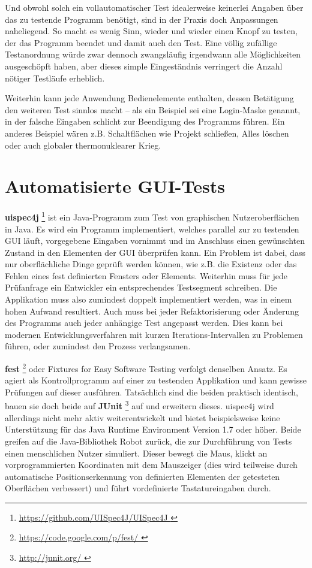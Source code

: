 Und obwohl solch ein vollautomatischer Test idealerweise keinerlei Angaben
über das zu testende Programm benötigt, sind in der Praxis doch Anpassungen
naheliegend. So macht es wenig Sinn, wieder und wieder einen Knopf zu testen,
der das Programm beendet und damit auch den Test. Eine völlig zufällige
Testanordnung würde zwar dennoch zwangsläufig irgendwann alle Möglichkeiten
ausgeschöpft haben, aber dieses simple Eingeständnis verringert die
Anzahl nötiger Testläufe erheblich.

Weiterhin kann jede Anwendung Bedienelemente enthalten, dessen Betätigung
den weiteren Test sinnlos macht -- als ein Beispiel sei eine Login-Maske genannt,
in der falsche Eingaben schlicht zur Beendigung des Programms führen.
Ein anderes Beispiel wären z.B. Schaltflächen wie
\glqq{}Projekt schließen\grqq{}, \glqq{}Alles löschen\grqq{} oder auch 
\glqq{}globaler thermonuklearer Krieg\grqq{}.


\section{Automatisierte GUI-Tests}\label{section:automatedguitesting}


\textbf{uispec4j} \footnote{\url{ https://github.com/UISpec4J/UISpec4J }} ist ein Java-Programm 
zum Test von graphischen Nutzeroberflächen
in Java. Es wird ein Programm implementiert, welches parallel zur zu testenden GUI läuft,
vorgegebene Eingaben vornimmt und im Anschluss einen gewünschten Zustand in den Elementen der GUI
überprüfen kann. Ein Problem ist dabei, dass nur oberflächliche Dinge geprüft werden können,
wie z.B. die Existenz oder das Fehlen eines fest definierten Fensters oder Elements. Weiterhin muss für jede
Prüfanfrage ein Entwickler ein entsprechendes Testsegment schreiben. Die Applikation muss also
zumindest doppelt implementiert werden, was in einem hohen Aufwand resultiert. Auch muss bei jeder
Refaktorisierung oder Änderung des Programms auch jeder anhängige Test angepasst werden.
Dies kann bei modernen Entwicklungsverfahren mit kurzen Iterations-Intervallen zu Problemen führen,
oder zumindest den Prozess verlangsamen.

\vspace{0.5cm}

\textbf{fest} \footnote{\url{ https://code.google.com/p/fest/ }} oder 
\glqq{}Fixtures for Easy Software Testing\grqq{} verfolgt denselben Ansatz.
Es agiert als Kontrollprogramm auf einer zu testenden Applikation und kann gewisse Prüfungen
auf dieser ausführen. Tatsächlich sind die beiden praktisch identisch, bauen sie doch beide
auf \textbf{JUnit} \footnote{\url{ http://junit.org/ }} auf und erweitern dieses.
uispec4j wird allerdings nicht mehr aktiv weiterentwickelt und bietet
beispielsweise keine Unterstützung für das Java Runtime Environment Version \glqq{}1.7\grqq{}
oder höher. Beide greifen auf die Java-Bibliothek \glqq{}Robot\grqq{} zurück,
die zur Durchführung von Tests einen menschlichen Nutzer simuliert. Dieser 
bewegt die Maus, klickt an vorprogrammierten Koordinaten mit dem Mauszeiger
(dies wird teilweise durch automatische Positionserkennung von definierten Elementen
der getesteten Oberflächen verbessert) und führt vordefinierte Tastatureingaben durch.


